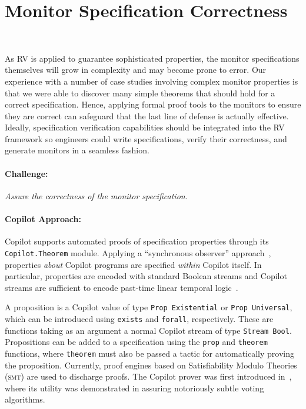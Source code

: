 \section{Monitor Specification Correctness}~\label{sec:verispec}

As RV is applied to  guarantee sophisticated properties, the
monitor specifications themselves will grow in complexity and may become
prone to error.  Our experience with a number of case studies
involving complex monitor properties is that we were able to discover
many simple theorems that should hold for a correct specification.  Hence, applying formal proof tools to the monitors to
ensure they are correct can safeguard that the last line of
defense is actually effective. Ideally, specification verification
capabilities should be integrated into the RV framework so engineers
could write specifications, verify their correctness, and generate
monitors in a seamless fashion.

\paragraph{Challenge:}  \emph{Assure  the correctness of the monitor
specification.}   

\paragraph{Copilot Approach:}  
 Copilot supports automated proofs of specification
 properties  through its {\tt Copilot.Theorem} module.  Applying a 
``synchronous observer'' approach~\cite{amast93}, properties \emph{about}
Copilot programs are specified \emph{within} Copilot itself. In particular,
properties are encoded with standard Boolean streams and Copilot streams are
sufficient to encode past-time linear temporal logic~\cite{ptltl}.

 A proposition is a Copilot value of type \texttt{Prop Existential}
 or \texttt{Prop Universal}, which can be introduced using \texttt{exists} and
\texttt{forall}, respectively. These are functions taking as an argument a
normal Copilot stream of type \lstinline{Stream Bool}. Propositions can be added
to a specification using the \texttt{prop} and \texttt{theorem} functions,
where \texttt{theorem} must also be passed a tactic for automatically proving
the proposition. Currently, proof engines  based on
Satisfiability Modulo Theories (\textsc{smt})   are used to discharge
proofs.  The Copilot prover was first introduced
in~\cite{pike-rv-15}, where its utility was demonstrated in assuring
notoriously subtle voting algorithms.


